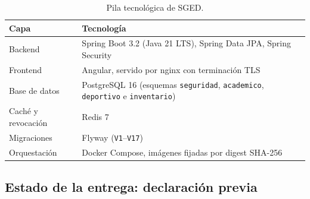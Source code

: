 \documentclass[11pt,a4paper]{article}
\begin{document}
\begin{table}[htbp]
\centering
\caption{Pila tecnológica de SGED.}
\label{tab:pila-tecnologica}
\begin{tabular}{@{}ll@{}}
\toprule
\textbf{Capa} & \textbf{Tecnología} \\
\midrule
Backend & Spring Boot 3.2 (Java 21 LTS), Spring Data JPA, Spring Security \\
Frontend & Angular, servido por nginx con terminación TLS \\
Base de datos & PostgreSQL 16 (esquemas \texttt{seguridad}, \texttt{academico}, \texttt{deportivo} e \texttt{inventario}) \\
Caché y revocación & Redis 7 \\
Migraciones & Flyway (\texttt{V1}--\texttt{V17}) \\
Orquestación & Docker Compose, imágenes fijadas por digest SHA-256 \\
\bottomrule
\end{tabular}
\end{table}

\subsection{Estado de la entrega: declaración previa}
\label{sec:estado-entrega}
\end{document}
